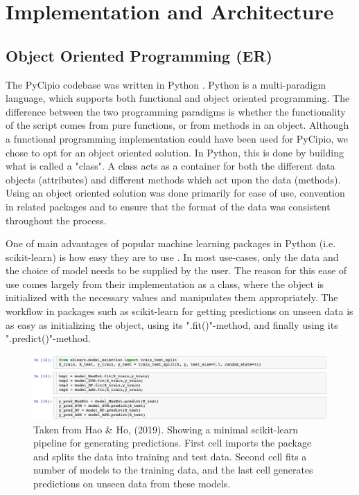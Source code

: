 \documentclass{article}
\begin{document}
\section{Implementation and Architecture}

\subsection{Object Oriented Programming (ER)}

\noindent The PyCipio codebase was written in Python \cite{Python_main}. Python is a multi-paradigm language, which supports both functional and object oriented programming. The difference between the two programming paradigms is whether the functionality of the script comes from pure functions, or from methods in an object. Although a functional programming implementation could have been used for PyCipio, we chose to opt for an object oriented solution. In Python, this is done by building what is called a "class". A class acts as a container for both the different data objects (attributes) and different methods which act upon the data (methods). Using an object oriented solution was done primarily for ease of use, convention in related packages and to ensure that the format of the data was consistent throughout the process.

\noindent One of main advantages of popular machine learning packages in Python (i.e. scikit-learn) is how easy they are to use \cite{Hao_ho}. In most use-cases, only the data and the choice of model needs to be supplied by the user. The reason for this ease of use comes largely from their implementation as a class, where the object is initialized with the necessary values and manipulates them appropriately. The workflow in packages such as scikit-learn for getting predictions on unseen data is as easy as initializing the object, using its ".fit()"-method, and finally using its ".predict()"-method. 

\begin{figure}[H]
    \centerline{\includegraphics{images/sklearn.jpeg}}
    \caption{Taken from Hao \& Ho, (2019). Showing a minimal scikit-learn pipeline for generating predictions. First cell imports the package and splits the data into training and test data. Second cell fits a number of models to the training data, and the last cell generates predictions on unseen data from these models. }
\end{figure}
\end{document}
